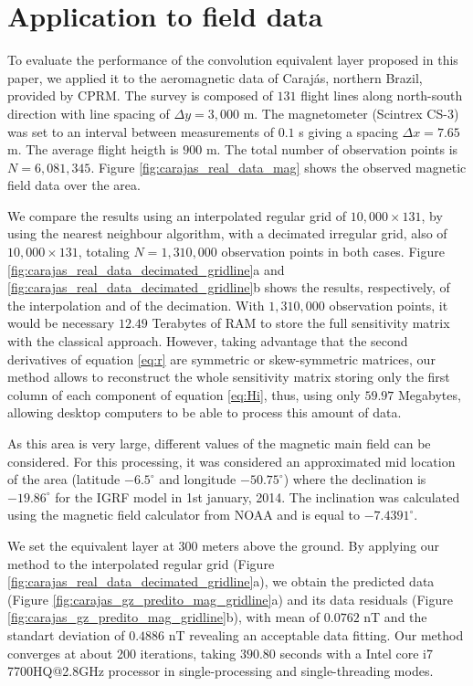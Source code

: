 \section{Application to field data}

To evaluate the performance of the convolution equivalent layer proposed in this paper, we applied it to the aeromagnetic data of Carajás, northern Brazil, provided by CPRM.
The survey is composed of $131$ flight lines along north-south direction with line spacing of 
$\Delta y = 3,000$ m. 
The magnetometer (Scintrex CS-3) was set to an interval between measurements of $0.1$ s giving a spacing $\Delta x = 7.65$ m. The average flight heigth is $900$ m. The total number of observation points is $N = 6,081,345$. Figure \ref{fig:carajas_real_data_mag} shows the observed magnetic field data over the area.

We compare the results using an interpolated regular grid of $10,000 \times 131$, by using the nearest neighbour algorithm, with a decimated irregular grid, also of $10,000 \times 131$, totaling $N = 1,310,000$ observation points in both cases. 
Figure \ref{fig:carajas_real_data_decimated_gridline}a and \ref{fig:carajas_real_data_decimated_gridline}b shows the results, respectively, of the interpolation and of the decimation. 
With $1,310,000$ observation points, it would be necessary $12.49$ Terabytes of RAM to store the full sensitivity matrix with the classical approach. 
However, taking advantage that the second derivatives of equation \ref{eq:r} are symmetric or skew-symmetric matrices, our method allows to reconstruct the whole sensitivity matrix storing only the first column of each component of equation \ref{eq:Hi}, thus, using only $59.97$ Megabytes, allowing desktop computers to be able to process this amount of data.

As this area is very large, different values of the magnetic main field can be considered. 
For this processing, it was considered an approximated mid location of the area (latitude $-6.5^{\circ}$ and longitude $-50.75^{\circ}$) where the declination is $-19.86^{\circ}$ for the IGRF model in 1st january, 2014. The inclination was calculated using the magnetic field calculator from NOAA and is equal to $-7.4391^{\circ}$. 

We set the equivalent layer at $300$ meters above the ground.
By applying our method to the interpolated regular grid 
(Figure \ref{fig:carajas_real_data_decimated_gridline}a), we obtain the  predicted data 
(Figure \ref{fig:carajas_gz_predito_mag_gridline}a) and its data residuals 
(Figure \ref{fig:carajas_gz_predito_mag_gridline}b), with mean of $0.0762$ nT and the standart deviation of $0.4886$ nT  revealing an acceptable data fitting.
Our method converges at about 200 iterations,  taking $390.80$ seconds with a Intel core i7 7700HQ@2.8GHz processor in single-processing and single-threading modes. 

